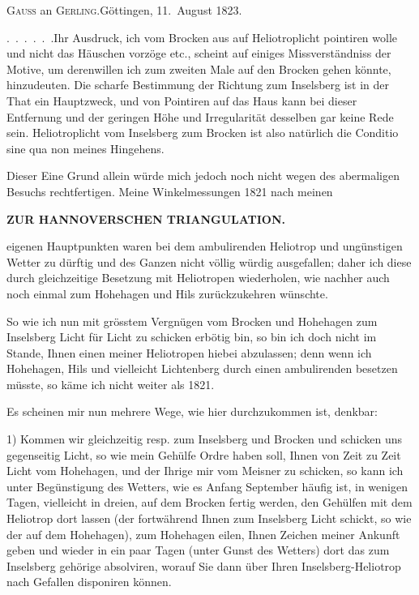 \begingroup
\newcommand{\GerlingSeconds}[2]{#1\makebox[.42em][c]{,\makebox[0pt][r]{\textsuperscript{s}}}#2}
\begin{center}
\textsc{Gauss} an \textsc{Gerling}.\quad Göttingen, 11.~August 1823.
\end{center}

\par\noindent\hspace*{\parindent}\mbox{.\ .\ .\ .\ .\ .\quad Ihr} Ausdruck,  ich vom Brocken aus auf Heliotroplicht pointiren wolle und nicht das Häuschen vorzöge etc., scheint auf einiges Missverständniss der Motive, um derenwillen ich zum zweiten Male auf den Brocken gehen könnte, hinzudeuten.
Die scharfe Bestimmung der Richtung zum Inselsberg ist in der That ein Hauptzweck, und von Pointiren auf das Haus kann bei dieser Entfernung und der geringen Höhe und Irregularität desselben gar keine Rede sein.
Heliotroplicht vom Inselsberg zum Brocken ist also natürlich die Conditio sine qua non meines Hingehens.
\par\noindent\hspace*{\parindent}Dieser Eine Grund allein würde mich jedoch noch nicht wegen des abermaligen Besuchs rechtfertigen.
Meine Winkelmessungen 1821 nach meinen
\par\clearpage
\noindent\null\hfill{\small\textbf{ZUR HANNOVERSCHEN TRIANGULATION.}}\hfill{}\par\medskip
\noindent eigenen Hauptpunkten waren bei dem ambulirenden Heliotrop und ungünstigen Wetter zu dürftig und des Ganzen nicht völlig würdig ausgefallen; daher ich diese durch gleichzeitige Besetzung mit Heliotropen wiederholen, wie nachher auch noch einmal zum Hohehagen und Hils zurückzukehren wünschte.
\par\noindent\hspace*{\parindent}So wie ich nun mit grösstem Vergnügen vom Brocken und Hohehagen zum Inselsberg Licht für Licht zu schicken erbötig bin, so bin ich doch nicht im Stande, Ihnen einen meiner Heliotropen hiebei abzulassen; denn wenn ich Hohehagen, Hils und vielleicht Lichtenberg durch einen ambulirenden besetzen müsste, so käme ich nicht weiter als 1821.
\par\noindent\hspace*{\parindent}Es scheinen mir nun mehrere Wege, wie hier durchzukommen ist, denkbar:
\par\noindent\hspace*{\parindent}1) Kommen wir gleichzeitig resp. zum Inselsberg und Brocken und schicken uns gegenseitig Licht, so wie mein Gehülfe Ordre haben soll, Ihnen von Zeit zu Zeit Licht vom Hohehagen, und der Ihrige mir vom Meisner zu schicken, so kann ich unter Begünstigung des Wetters, wie es Anfang September häufig ist, in wenigen Tagen, vielleicht in dreien, auf dem Brocken fertig werden, den Gehülfen mit dem Heliotrop dort lassen (der fortwährend Ihnen zum Inselsberg Licht schickt, so wie der auf dem Hohehagen), zum Hohehagen eilen, Ihnen Zeichen meiner Ankunft geben und wieder in ein paar Tagen (unter Gunst des Wetters) dort das zum Inselsberg gehörige absolviren, worauf Sie dann über Ihren Inselsberg-Heliotrop nach Gefallen disponiren können.
